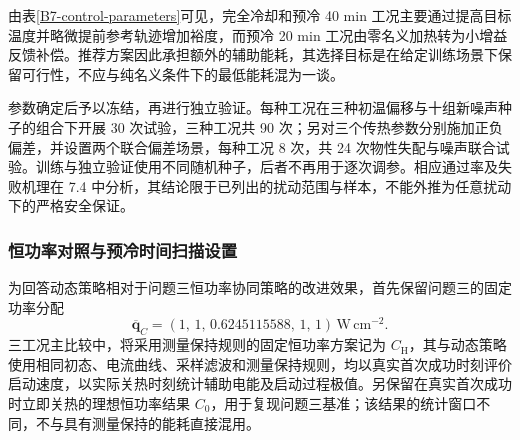 \documentclass[bwprint]{gmcmthesis}
\numberwithin{figure}{section}
\begin{document}
\begin{table}[htbp]
    \centering
    \caption{三种预冷工况的名义节能与推荐留裕度控制参数}
    \vspace{0.3cm}
    \label{B7-control-parameters}
    \renewcommand{\arraystretch}{1.5}
\end{table}

由表\ref{B7-control-parameters}可见，完全冷却和预冷 40 min 工况主要通过提高目标温度并略微提前参考轨迹增加裕度，而预冷 20 min 工况由零名义加热转为小增益反馈补偿。推荐方案因此承担额外的辅助能耗，其选择目标是在给定训练场景下保留可行性，不应与纯名义条件下的最低能耗混为一谈。

参数确定后予以冻结，再进行独立验证。每种工况在三种初温偏移与十组新噪声种子的组合下开展 30 次试验，三种工况共 90 次；另对三个传热参数分别施加正负偏差，并设置两个联合偏差场景，每种工况 8 次，共 24 次物性失配与噪声联合试验。训练与独立验证使用不同随机种子，后者不再用于逐次调参。相应通过率及失败机理在 7.4 中分析，其结论限于已列出的扰动范围与样本，不能外推为任意扰动下的严格安全保证。

\subsubsection{恒功率对照与预冷时间扫描设置}
为回答动态策略相对于问题三恒功率协同策略的改进效果，首先保留问题三的固定功率分配
\begin{equation}
\overline{\boldsymbol q}_{C}=
(1,\,1,\,0.6245115588,\,1,\,1)\,\mathrm{W\,cm^{-2}}.
\tag{7-44}\label{eq:q4:solver_constant_power}
\end{equation}
三工况主比较中，将采用测量保持规则的固定恒功率方案记为 \(C_{\mathrm H}\)，其与动态策略使用相同初态、电流曲线、采样滤波和测量保持规则，均以真实首次成功时刻评价启动速度，以实际关热时刻统计辅助电能及启动过程极值。另保留在真实首次成功时立即关热的理想恒功率结果 \(C_0\)，用于复现问题三基准；该结果的统计窗口不同，不与具有测量保持的能耗直接混用。
\end{document}
